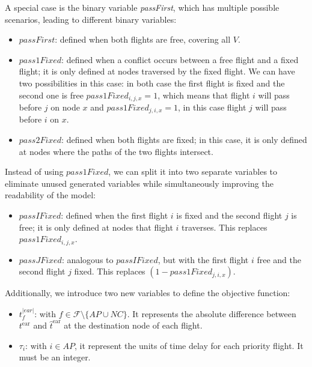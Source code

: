 \documentclass[../thesis.tex]{subfiles}
\begin{document}
A special case is the binary variable \textit{passFirst}, which has multiple possible scenarios, leading to different binary variables:

\begin{itemize}
    \item $passFirst$: defined when both flights are free, covering all $V$.
    \item $pass1Fixed$: defined when a conflict occurs between a free flight and a fixed flight; it is only defined at nodes traversed by the fixed flight.
    We can have two possibilities in this case: in both case the first flight is fixed and the second one is free
    $pass1Fixed_{i,j,x}=1$, which means that flight $i$ will pass before $j$ on node $x$ and $pass1Fixed_{j,i,x}=1$, in this case flight $j$ will pass before $i$ on $x$.
    \item $pass2Fixed$: defined when both flights are fixed; in this case, it is only defined at nodes where the paths of the two flights intersect.
\end{itemize}

Instead of using $pass1Fixed$, we can split it into two separate variables to eliminate unused generated variables while simultaneously improving the readability of the model:

\begin{itemize}
    \item $passIFixed$: defined when the first flight $i$ is fixed and the second flight $j$ is free; it is only defined at nodes that flight $i$ traverses. This replaces $pass1Fixed_{i,j,x}$.
    \item $passJFixed$: analogous to $passIFixed$, but with the first flight $i$ free and the second flight $j$ fixed. This replaces $(1 - pass1Fixed_{j,i,x})$.
\end{itemize}
Additionally, we introduce two new variables to define the objective function:
\begin{itemize}
    \item $t^{|ear|}_{f}$: with $f\in\mathcal F\setminus\{AP\cup NC\}$.
    It represents the absolute difference between $t^\text{ear}$ and $\hat{t}^\text{ear}$ at the destination node of each flight.
    \item $\tau_i$:  with $i\in AP$, it  represent the units of time delay for each priority flight. It must be an integer.
\end{itemize}
\end{document}
